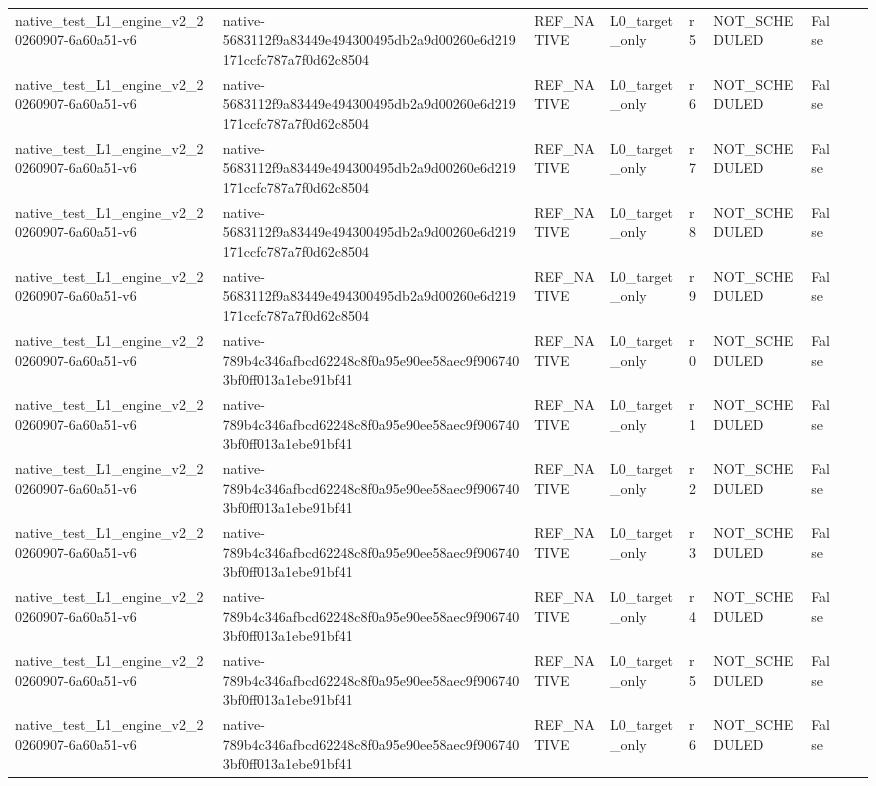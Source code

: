 \begin{tabular}{lllllllll}
native\_test\_L1\_engine\_v2\_20260907-6a60a51-v6 & native-5683112f9a83449e494300495db2a9d00260e6d219171ccfc787a7f0d62c8504 & REF\_NATIVE & L0\_target\_only & r5 & NOT\_SCHEDULED & False &  &  \\
native\_test\_L1\_engine\_v2\_20260907-6a60a51-v6 & native-5683112f9a83449e494300495db2a9d00260e6d219171ccfc787a7f0d62c8504 & REF\_NATIVE & L0\_target\_only & r6 & NOT\_SCHEDULED & False &  &  \\
native\_test\_L1\_engine\_v2\_20260907-6a60a51-v6 & native-5683112f9a83449e494300495db2a9d00260e6d219171ccfc787a7f0d62c8504 & REF\_NATIVE & L0\_target\_only & r7 & NOT\_SCHEDULED & False &  &  \\
native\_test\_L1\_engine\_v2\_20260907-6a60a51-v6 & native-5683112f9a83449e494300495db2a9d00260e6d219171ccfc787a7f0d62c8504 & REF\_NATIVE & L0\_target\_only & r8 & NOT\_SCHEDULED & False &  &  \\
native\_test\_L1\_engine\_v2\_20260907-6a60a51-v6 & native-5683112f9a83449e494300495db2a9d00260e6d219171ccfc787a7f0d62c8504 & REF\_NATIVE & L0\_target\_only & r9 & NOT\_SCHEDULED & False &  &  \\
native\_test\_L1\_engine\_v2\_20260907-6a60a51-v6 & native-789b4c346afbcd62248c8f0a95e90ee58aec9f9067403bf0ff013a1ebe91bf41 & REF\_NATIVE & L0\_target\_only & r0 & NOT\_SCHEDULED & False &  &  \\
native\_test\_L1\_engine\_v2\_20260907-6a60a51-v6 & native-789b4c346afbcd62248c8f0a95e90ee58aec9f9067403bf0ff013a1ebe91bf41 & REF\_NATIVE & L0\_target\_only & r1 & NOT\_SCHEDULED & False &  &  \\
native\_test\_L1\_engine\_v2\_20260907-6a60a51-v6 & native-789b4c346afbcd62248c8f0a95e90ee58aec9f9067403bf0ff013a1ebe91bf41 & REF\_NATIVE & L0\_target\_only & r2 & NOT\_SCHEDULED & False &  &  \\
native\_test\_L1\_engine\_v2\_20260907-6a60a51-v6 & native-789b4c346afbcd62248c8f0a95e90ee58aec9f9067403bf0ff013a1ebe91bf41 & REF\_NATIVE & L0\_target\_only & r3 & NOT\_SCHEDULED & False &  &  \\
native\_test\_L1\_engine\_v2\_20260907-6a60a51-v6 & native-789b4c346afbcd62248c8f0a95e90ee58aec9f9067403bf0ff013a1ebe91bf41 & REF\_NATIVE & L0\_target\_only & r4 & NOT\_SCHEDULED & False &  &  \\
native\_test\_L1\_engine\_v2\_20260907-6a60a51-v6 & native-789b4c346afbcd62248c8f0a95e90ee58aec9f9067403bf0ff013a1ebe91bf41 & REF\_NATIVE & L0\_target\_only & r5 & NOT\_SCHEDULED & False &  &  \\
native\_test\_L1\_engine\_v2\_20260907-6a60a51-v6 & native-789b4c346afbcd62248c8f0a95e90ee58aec9f9067403bf0ff013a1ebe91bf41 & REF\_NATIVE & L0\_target\_only & r6 & NOT\_SCHEDULED & False &  &  \\

\end{tabular}
